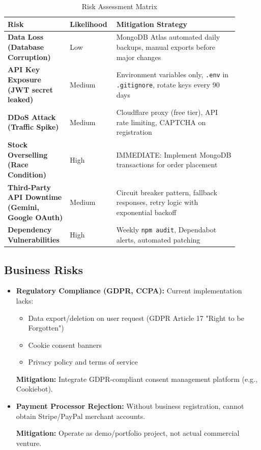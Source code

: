 \begin{table}[H]
\centering
\caption{Risk Assessment Matrix}
\label{tab:risk_matrix}
\small
\begin{tabular}{@{}p{0.25\linewidth}p{0.15\linewidth}p{0.50\linewidth}@{}}
\toprule
\textbf{Risk} & \textbf{Likelihood} & \textbf{Mitigation Strategy} \\
\midrule
\textbf{Data Loss (Database Corruption)} & Low & MongoDB Atlas automated daily backups, manual exports before major changes \\
\textbf{API Key Exposure (JWT secret leaked)} & Medium & Environment variables only, \texttt{.env} in \texttt{.gitignore}, rotate keys every 90 days \\
\textbf{DDoS Attack (Traffic Spike)} & Medium & Cloudflare proxy (free tier), API rate limiting, CAPTCHA on registration \\
\textbf{Stock Overselling (Race Condition)} & High & IMMEDIATE: Implement MongoDB transactions for order placement \\
\textbf{Third-Party API Downtime (Gemini, Google OAuth)} & Medium & Circuit breaker pattern, fallback responses, retry logic with exponential backoff \\
\textbf{Dependency Vulnerabilities} & High & Weekly \texttt{npm audit}, Dependabot alerts, automated patching \\
\bottomrule
\end{tabular}
\end{table}

\subsection{Business Risks}

\begin{itemize}
    \item \textbf{Regulatory Compliance (GDPR, CCPA):} Current implementation lacks:
    \begin{itemize}
        \item Data export/deletion on user request (GDPR Article 17 "Right to be Forgotten")
        \item Cookie consent banners
        \item Privacy policy and terms of service
    \end{itemize}
    
    \textbf{Mitigation:} Integrate GDPR-compliant consent management platform (e.g., Cookiebot).
    
    \item \textbf{Payment Processor Rejection:} Without business registration, cannot obtain Stripe/PayPal merchant accounts.
    
    \textbf{Mitigation:} Operate as demo/portfolio project, not actual commercial venture.
\end{itemize}

